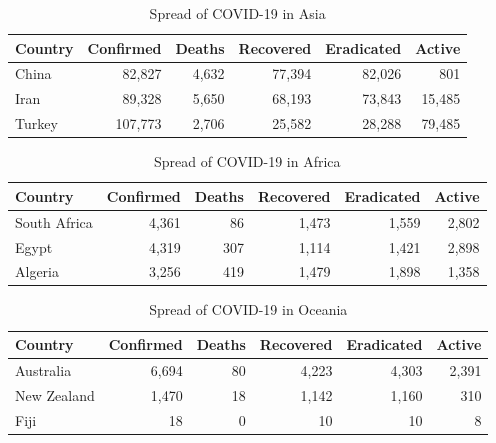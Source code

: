 \documentclass{homework}
\begin{document}
\vspace{-1.5em}

\begin{table}[H]
  \caption{Spread of COVID-19 in Asia}
  \label{Asia Spread}
  \centering
  \begin{tabular}{lrrrrr}
    \toprule
    Country & Confirmed & Deaths & Recovered & Eradicated & Active \\
    \midrule
    China   & 82,827     & 4,632   & 77,394     & 82,026      & 801    \\
    Iran    & 89,328     & 5,650   & 68,193     & 73,843      & 15,485  \\
    Turkey  & 107,773    & 2,706   & 25,582     & 28,288      & 79,485  \\
    \bottomrule
  \end{tabular}
\end{table}

\vspace{-1.5em}

\begin{table}[H]
  \caption{Spread of COVID-19 in Africa}
  \label{Africa Spread}
  \centering
  \begin{tabular}{lrrrrr}
    \toprule
    Country      & Confirmed & Deaths & Recovered & Eradicated & Active \\
    \midrule
    South Africa & 4,361      & 86     & 1,473      & 1,559       & 2,802   \\
    Egypt        & 4,319      & 307    & 1,114      & 1,421       & 2,898   \\
    Algeria      & 3,256      & 419    & 1,479      & 1,898       & 1,358   \\
    \bottomrule
  \end{tabular}
\end{table}

\vspace{-1em}

\begin{table}[H]
  \caption{Spread of COVID-19 in Oceania}
  \label{Oceania Spread}
  \centering
  \begin{tabular}{lrrrrr}
    \toprule
    Country     & Confirmed & Deaths & Recovered & Eradicated & Active \\
    \midrule
    Australia   & 6,694      & 80     & 4,223      & 4,303       & 2,391   \\
    New Zealand & 1,470      & 18     & 1,142      & 1,160       & 310    \\
    Fiji        & 18        & 0      & 10        & 10         & 8      \\
    \bottomrule
  \end{tabular}
\end{table}
\end{document}

